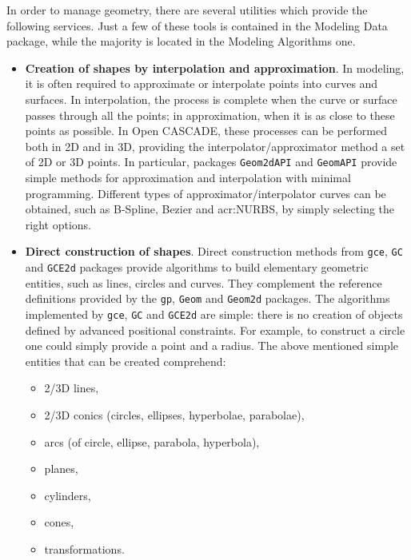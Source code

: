 In order to manage geometry, there are several utilities which provide the following services. Just a few of these tools is contained in the Modeling Data package, while the majority is located in the Modeling Algorithms one.
%
\begin{itemize}
\renewcommand\labelitemi{\tiny$\blacksquare$}
\renewcommand\labelitemii{\tiny$\bullet$}
\item \textbf{Creation of shapes by interpolation and approximation}. In modeling, it is often required to approximate or interpolate points into curves and surfaces. In interpolation, the process is complete when the curve or surface passes through all the points; in approximation, when it is as close to these points as possible. In Open CASCADE, these processes can be performed both in 2D and in 3D, providing the interpolator/approximator method a set of 2D or 3D points. In particular, packages \lstinline[language=Java]!Geom2dAPI! and \lstinline[language=Java]!GeomAPI! provide simple methods for approximation and interpolation with minimal programming. Different types of approximator/interpolator curves can be obtained, such as B-Spline, Bezier and \gls{acr:NURBS}, by simply selecting the right options.
\item \textbf{Direct construction of shapes}. Direct construction methods from \lstinline[language=Java]!gce!, \lstinline[language=Java]!GC! and \lstinline[language=Java]!GCE2d! packages provide algorithms to build elementary geometric entities, such as lines, circles and curves. They complement the reference definitions provided by the \lstinline[language=Java]!gp!, \lstinline[language=Java]!Geom! and \lstinline[language=Java]!Geom2d! packages. The algorithms implemented by \lstinline[language=Java]!gce!, \lstinline[language=Java]!GC! and \lstinline[language=Java]!GCE2d! are simple: there is no creation of objects defined by advanced positional constraints. For example, to construct a circle one could simply provide a point and a radius. The above mentioned simple entities that can be created comprehend:
	\begin{itemize}
	\item 2/3D lines,
	\item 2/3D conics (circles, ellipses, hyperbolae, parabolae),
	\item arcs (of circle, ellipse, parabola, hyperbola),
	\item planes,
	\item cylinders,
	\item cones,
	\item transformations.

\end{itemize}
\end{itemize}
